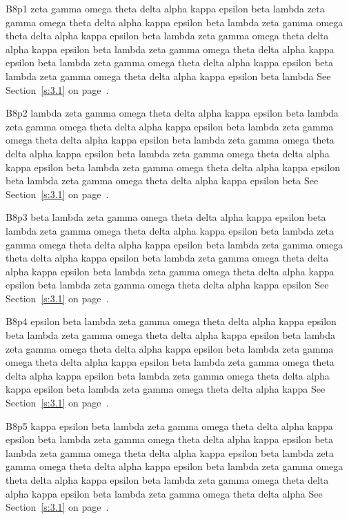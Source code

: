 B8p1 zeta gamma omega theta delta alpha kappa epsilon beta lambda zeta gamma omega theta delta alpha kappa epsilon beta lambda zeta gamma omega theta delta alpha kappa epsilon beta lambda zeta gamma omega theta delta alpha kappa epsilon beta lambda zeta gamma omega theta delta alpha kappa epsilon beta lambda zeta gamma omega theta delta alpha kappa epsilon beta lambda zeta gamma omega theta delta alpha kappa epsilon beta lambda See Section~\ref{s:3.1} on page~\pageref{s:3.1}.

B8p2 lambda zeta gamma omega theta delta alpha kappa epsilon beta lambda zeta gamma omega theta delta alpha kappa epsilon beta lambda zeta gamma omega theta delta alpha kappa epsilon beta lambda zeta gamma omega theta delta alpha kappa epsilon beta lambda zeta gamma omega theta delta alpha kappa epsilon beta lambda zeta gamma omega theta delta alpha kappa epsilon beta lambda zeta gamma omega theta delta alpha kappa epsilon beta See Section~\ref{s:3.1} on page~\pageref{s:3.1}.

B8p3 beta lambda zeta gamma omega theta delta alpha kappa epsilon beta lambda zeta gamma omega theta delta alpha kappa epsilon beta lambda zeta gamma omega theta delta alpha kappa epsilon beta lambda zeta gamma omega theta delta alpha kappa epsilon beta lambda zeta gamma omega theta delta alpha kappa epsilon beta lambda zeta gamma omega theta delta alpha kappa epsilon beta lambda zeta gamma omega theta delta alpha kappa epsilon See Section~\ref{s:3.1} on page~\pageref{s:3.1}.

B8p4 epsilon beta lambda zeta gamma omega theta delta alpha kappa epsilon beta lambda zeta gamma omega theta delta alpha kappa epsilon beta lambda zeta gamma omega theta delta alpha kappa epsilon beta lambda zeta gamma omega theta delta alpha kappa epsilon beta lambda zeta gamma omega theta delta alpha kappa epsilon beta lambda zeta gamma omega theta delta alpha kappa epsilon beta lambda zeta gamma omega theta delta alpha kappa See Section~\ref{s:3.1} on page~\pageref{s:3.1}.

B8p5 kappa epsilon beta lambda zeta gamma omega theta delta alpha kappa epsilon beta lambda zeta gamma omega theta delta alpha kappa epsilon beta lambda zeta gamma omega theta delta alpha kappa epsilon beta lambda zeta gamma omega theta delta alpha kappa epsilon beta lambda zeta gamma omega theta delta alpha kappa epsilon beta lambda zeta gamma omega theta delta alpha kappa epsilon beta lambda zeta gamma omega theta delta alpha See Section~\ref{s:3.1} on page~\pageref{s:3.1}.

